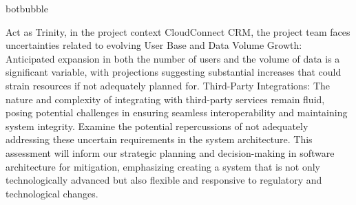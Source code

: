 \begin{chatout}{botbubble}{}
\newline
{}\newline
{}\newline
{}
\end{chatout}

 Act as Trinity, in the project context CloudConnect CRM, the project team faces uncertainties related to evolving User Base and Data Volume Growth: Anticipated expansion in both the number of users and the volume of data is a significant variable, with projections suggesting substantial increases that could strain resources if not adequately planned for. Third-Party Integrations: The nature and complexity of integrating with third-party services remain fluid, posing potential challenges in ensuring seamless interoperability and maintaining system integrity. Examine the potential repercussions of not adequately addressing these uncertain requirements in the system architecture. This assessment will inform our strategic planning and decision-making in software architecture for mitigation, emphasizing creating a system that is not only technologically advanced but also flexible and responsive to regulatory and technological changes.

